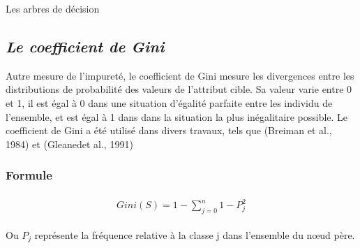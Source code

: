 \documentclass[a4paper, 11pt]{report}
\begin{document}
\begin{chapter}{Les arbres de décision}
\begin{itemize}
\end{itemize}


\subsection*{\emph{Le coefficient de Gini}}
Autre mesure de l'impureté, le coefficient de Gini mesure les divergences entre les distributions de probabilité des valeurs de l'attribut cible. Sa valeur varie entre 0 et 1, il est égal à 0 dans une situation d'égalité parfaite entre les individu de l'ensemble, et est égal à 1 dans dans la situation la plus inégalitaire possible. Le coefficient de Gini a été utilisé dans divers travaux, tels que (Breiman et al., 1984) et (Gleanedet al., 1991)\cite{singh2014comparative}
\subsubsection*{Formule}
\begin{align}
\begin{split}\label{formule:Gini}
Gini(S) = 1-\sum\limits_{j=0}^n 1- P_j^2\end{split}
\end{align}

Ou $P_j$ représente la fréquence relative à la classe j dans l'ensemble du nœud père.

\end{chapter}
\end{document}
